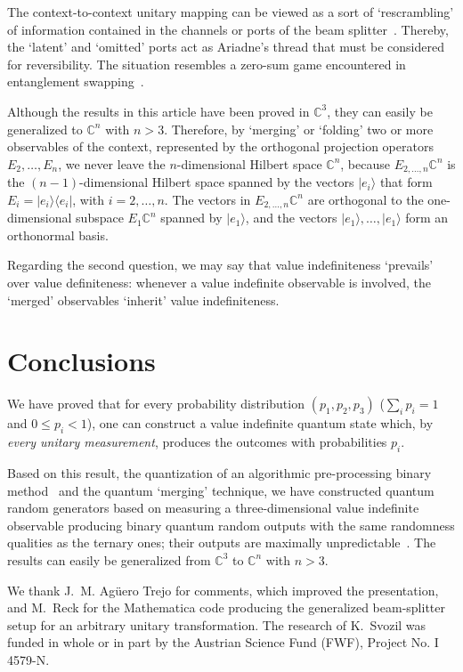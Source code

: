 \documentclass[%
 reprint,
 superscriptaddress,
 showpacs,
 showkeys,
 nofootinbib,
  amsmath,amssymb,
 pra,
  longbibliography,
  floatfix,
 ]{revtex4-2}
\theoremstyle{definition}
\newcommand{\C}{\mathbb{C}}
\begin{document}
The context-to-context unitary mapping can be viewed as a sort of `rescrambling'
of information contained in the channels or ports of the beam splitter~\cite{schrodinger-gwsidqm2,zeil-99}.
Thereby, the `latent' and `omitted' ports act as Ariadne's thread that must be considered for reversibility.
The situation resembles a zero-sum game encountered in
entanglement swapping~\cite{BBCJPW,peres-DelayedChoiceEntanglementSwapping}.


Although the results in this article have been proved in  $\C^3$, they can easily be generalized to $\C^n$ with $ n>3$.
Therefore, by `merging'
or `folding'
two or more observables of the context, represented by the orthogonal projection operators $E_2,\ldots , E_n$,
we never leave the $n$-dimensional Hilbert space $\C^n$,
because $E_{2,\ldots,n}\C^n$ is the $(n-1)$-dimensional Hilbert space spanned by the vectors
$\vert e_i\rangle$ that form
$E_i=\vert e_i\rangle \langle e_i \vert$, with $i=2,\ldots, n$.
The vectors in $E_{2,\ldots,n}\C^n$ are orthogonal to the one-dimensional subspace $E_{1}\C^n$ spanned by $\vert e_1\rangle$,
and the vectors $\vert e_1\rangle,\ldots ,\vert e_1\rangle$ form an orthonormal basis.

Regarding the second question, we may say that value indefiniteness `prevails' over value definiteness: whenever a value indefinite observable is involved, the `merged' observables `inherit' value indefiniteness.


\section{Conclusions}


We have proved that
for every probability distribution $(p_1,p_2,p_3)$ ($\sum_{i}p_i=1$ and $0\le  p_i < 1$), one can construct a value indefinite quantum state which, by {\it every unitary  measurement}, produces the
outcomes with probabilities $p_i$.


Based on this result, the quantization of an algorithmic pre-processing binary method~\cite{CALUDE202131} and the quantum `merging' technique, we have constructed quantum random generators based on measuring a three-dimensional value indefinite observable producing binary quantum random outputs with the same randomness qualities as the ternary ones; their outputs are maximally unpredictable~\cite{2014-nobit}. The results can easily be generalized from $\C^3$ to $\C^n$ with $ n>3$.


\begin{acknowledgments}
We thank J.~M. Ag\"{u}ero Trejo for comments, which improved the presentation, and M.~Reck for the Mathematica code producing the generalized beam-splitter setup for an arbitrary unitary transformation.
The research of K.~Svozil was funded in whole or in part by the Austrian Science Fund (FWF), Project No. I 4579-N.
\end{acknowledgments}



%

\end{document}
